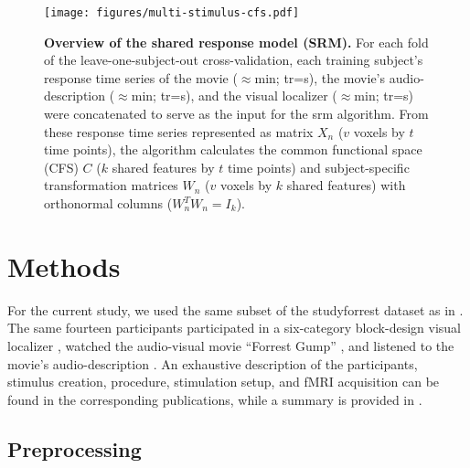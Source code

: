 \begin{figure*}[tbp]
\centering
\texttt{[image: figures/multi-stimulus-cfs.pdf]}
\caption{
%
    \textbf{Overview of the shared response model (SRM).
}
    For each fold of the leave-one-subject-out cross-validation, each training
    subject's response time series of
    the movie ($\approx$\unit[120]{min}; \acf{tr}=\unit[2]{s}),
    the movie's audio-description ($\approx$\unit[120]{min};
    \ac{tr}=\unit[2]{s}),
    and the visual localizer ($\approx$\unit[20]{min}; \ac{tr}=\unit[2]{s})
    were concatenated to serve as the input for the \ac{srm} algorithm.
    From these response time series represented as matrix $X_{n}$ ({$v$} voxels
    by $t$ time points), the algorithm calculates the common functional
    space (CFS) $C$ ($k$ shared features by $t$ time points) and
    subject-specific transformation matrices $W_{n}$
    ($v$ voxels by $k$ shared features) with orthonormal columns
    ($W_{n}^{T}W_{n}=I_{k}$).
} \label{fig:multi-stimulus-cfs} \end{figure*}





\section{Methods}


For the current study, we used the same subset of the studyforrest dataset as in
\citet{haeusler2022processing}.
%
The same fourteen participants
participated in a six-category block-design visual localizer
\citep{sengupta2016extension},
watched the audio-visual movie ``Forrest Gump'' \citep{hanke2016simultaneous},
and
listened to the movie's audio-description \citep{hanke2014audiomovie}.
An exhaustive description of the participants, stimulus creation, procedure,
stimulation setup, and fMRI acquisition can be found in the corresponding
publications, while a summary is provided in \citet{haeusler2022processing}.



\subsection{Preprocessing}

